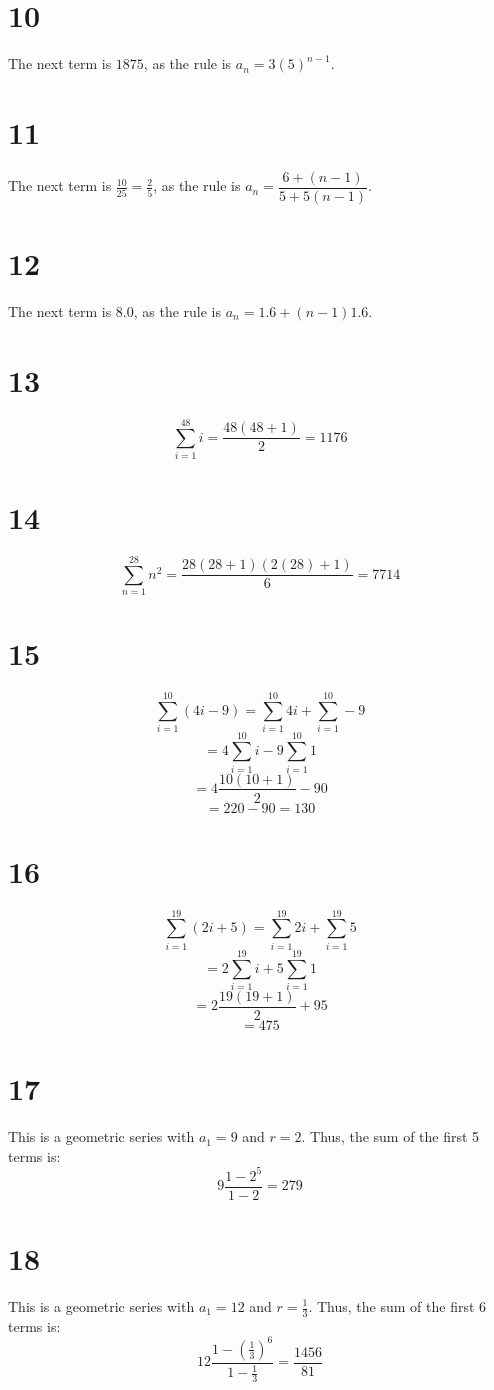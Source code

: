 \documentclass{article}
\theoremstyle{definition}
\newcommand{\?}{\stackrel{?}{=}}
\begin{document}
\section*{10}
The next term is $1875$, as the rule is $a_n=3(5)^{n-1}$.

\section*{11}
The next term is $\frac{10}{25}=\frac{2}{5}$, as the rule is $a_n=\dfrac{6+(n-1)}{5+5(n-1)}$.

\section*{12}
The next term is $8.0$, as the rule is $a_n=1.6+(n-1)1.6$.

\section*{13}
\[ \sum_{i=1}^{48}i=\frac{48(48+1)}{2}=1176 \]

\section*{14}
\[ \sum_{n=1}^{28}n^2=\frac{28(28+1)(2(28)+1)}{6}=7714 \]

\section*{15}
\[ \sum_{i=1}^{10}(4i-9)=\sum_{i=1}^{10}4i+\sum_{i=1}^{10}-9 \]
\[ =4\sum_{i=1}^{10}i-9\sum_{i=1}^{10}1 \]
\[ =4\frac{10(10+1)}{2}-90 \]
\[ =220-90=130 \]

\section*{16}
\[ \sum_{i=1}^{19}(2i+5)=\sum_{i=1}^{19}2i+\sum_{i=1}^{19}5 \]
\[ =2\sum_{i=1}^{19}i+5\sum_{i=1}^{19}1 \]
\[ =2\frac{19(19+1)}{2}+95 \]
\[ =475 \]

\section*{17}
This is a geometric series with $a_1=9$ and $r=2$. Thus, the sum of the first 5 terms is:
\[ 9\frac{1-2^5}{1-2}=279 \]

\section*{18}
This is a geometric series with $a_1=12$ and $r=\frac{1}{3}$. Thus, the sum of the first 6 terms is:
\[ 12\frac{1-(\frac{1}{3})^6}{1-\frac{1}{3}}=\frac{1456}{81} \]
\end{document}

